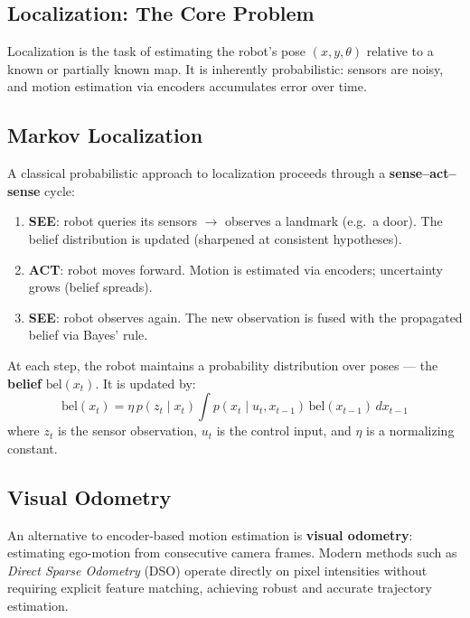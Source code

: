 \documentclass[11pt,a4paper]{article}
\theoremstyle{definition}
\theoremstyle{plain}
\theoremstyle{remark}
\begin{document}
\subsection{Localization: The Core Problem}

Localization is the task of estimating the robot's pose $(x, y, \theta)$ relative to a known or partially known map. It is inherently probabilistic: sensors are noisy, and motion estimation via encoders accumulates error over time.

\subsection{Markov Localization}

A classical probabilistic approach to localization proceeds through a \textbf{sense–act–sense} cycle:

\begin{enumerate}
    \item \textbf{SEE}: robot queries its sensors $\to$ observes a landmark (e.g.\ a door). The belief distribution is updated (sharpened at consistent hypotheses).
    \item \textbf{ACT}: robot moves forward. Motion is estimated via encoders; uncertainty grows (belief spreads).
    \item \textbf{SEE}: robot observes again. The new observation is fused with the propagated belief via Bayes' rule.
\end{enumerate}

\begin{tcolorbox}[colback=blue!5!white,colframe=blue!75!black,title=\textbf{Belief Update}]
At each step, the robot maintains a probability distribution over poses — the \textbf{belief} $\text{bel}(x_t)$. It is updated by:
\[
\text{bel}(x_t) = \eta \, p(z_t \mid x_t) \int p(x_t \mid u_t, x_{t-1})\, \text{bel}(x_{t-1})\, dx_{t-1}
\]
where $z_t$ is the sensor observation, $u_t$ is the control input, and $\eta$ is a normalizing constant.
\end{tcolorbox}

\subsection{Visual Odometry}

An alternative to encoder-based motion estimation is \textbf{visual odometry}: estimating ego-motion from consecutive camera frames. Modern methods such as \textit{Direct Sparse Odometry} (DSO) operate directly on pixel intensities without requiring explicit feature matching, achieving robust and accurate trajectory estimation.
\end{document}

